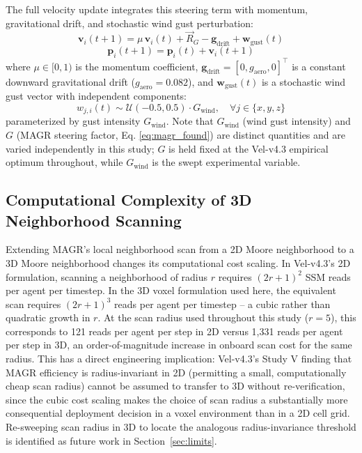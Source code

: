 \documentclass[10pt,journal]{IEEEtran}
\begin{document}
The full velocity update integrates this steering term with momentum,
gravitational drift, and stochastic wind gust perturbation:
\begin{equation}
\mathbf{v}_i(t+1) = \mu\,\mathbf{v}_i(t) + \vec{R}_G - \mathbf{g}_{\text{drift}} + \mathbf{w}_{\text{gust}}(t)
\label{eq:vel_update}
\end{equation}
\begin{equation}
\mathbf{p}_i(t+1) = \mathbf{p}_i(t) + \mathbf{v}_i(t+1)
\end{equation}
where $\mu\in[0,1)$ is the momentum coefficient, $\mathbf{g}_{\text{drift}} =
[0, g_{\text{aero}}, 0]^\top$ is a constant downward gravitational drift
($g_{\text{aero}}=0.082$), and $\mathbf{w}_{\text{gust}}(t)$ is a stochastic
wind gust vector with independent components:
\begin{equation}
w_{j,i}(t) \sim \mathcal{U}(-0.5, 0.5) \cdot G_{\text{wind}}, \quad \forall j\in\{x,y,z\}
\label{eq:gust}
\end{equation}
parameterized by gust intensity $G_{\text{wind}}$. Note that
$G_{\text{wind}}$ (wind gust intensity) and $G$ (MAGR steering factor, Eq.
\ref{eq:magr_found}) are distinct quantities and are varied independently
in this study; $G$ is held fixed at the Vel-v4.3 empirical optimum
throughout, while $G_{\text{wind}}$ is the swept experimental variable.

\subsection{Computational Complexity of 3D Neighborhood Scanning}
Extending MAGR's local neighborhood scan from a 2D Moore neighborhood to a
3D Moore neighborhood changes its computational cost scaling. In Vel-v4.3's
2D formulation, scanning a neighborhood of radius $r$ requires
$(2r+1)^2$ SSM reads per agent per timestep. In the 3D voxel formulation
used here, the equivalent scan requires $(2r+1)^3$ reads per agent per
timestep -- a cubic rather than quadratic growth in $r$. At the scan
radius used throughout this study ($r=5$), this corresponds to 121 reads
per agent per step in 2D versus 1{,}331 reads per agent per step in 3D, an
order-of-magnitude increase in onboard scan cost for the same radius. This
has a direct engineering implication: Vel-v4.3's Study V finding that MAGR
efficiency is radius-invariant in 2D (permitting a small, computationally
cheap scan radius) cannot be assumed to transfer to 3D without
re-verification, since the cubic cost scaling makes the choice of scan
radius a substantially more consequential deployment decision in a voxel
environment than in a 2D cell grid. Re-sweeping scan radius in 3D to locate
the analogous radius-invariance threshold is identified as future work in
Section~\ref{sec:limits}.
\end{document}
